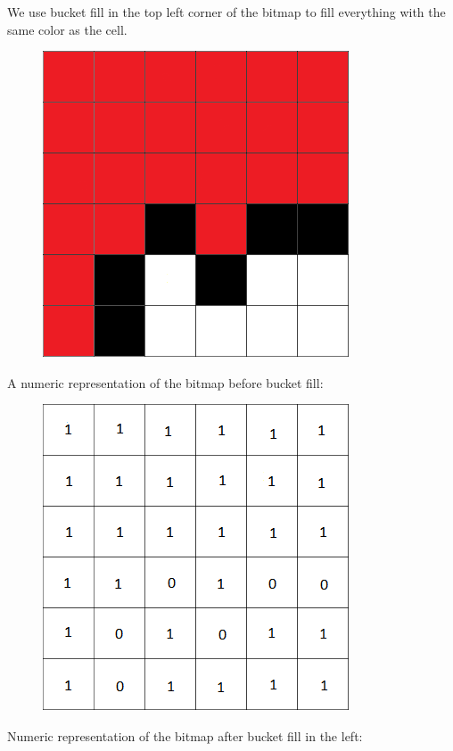 \documentclass[11pt,oneside]{book}
\makeatletter
\def\maxwidth#1{\ifdim\Gin@nat@width>#1 #1\else\Gin@nat@width\fi}
\makeatother
\begin{document}
We use bucket fill in the top left corner of the bitmap to fill everything with the same color as the cell.

\vspace{5px}\begin{figure}[H]\centering
        \includegraphics[width=0.66\maxwidth{\textwidth}]{bucket2.png}
        \end{figure}

A numeric representation of the bitmap before bucket fill:

\vspace{5px}\begin{figure}[H]\centering
        \includegraphics[width=0.66\maxwidth{\textwidth}]{bucket3.png}
        \end{figure}

Numeric representation of the bitmap after bucket fill in the left:
\end{document}
